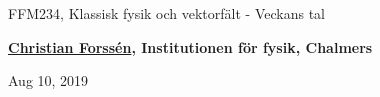 \documentclass[%
oneside,                 %
final,                   %
10pt]{article}
\begin{document}

\newcommand{\exercisesection}[1]{\subsection*{#1}}







\thispagestyle{empty}

\begin{center}
{\LARGE\bf
\begin{spacing}{1.25}
FFM234, Klassisk fysik och vektorfält - Veckans tal
\end{spacing}
}
\end{center}


\begin{center}
{\bf \href{{http://fy.chalmers.se/subatom/nt/}}{Christian Forssén}, Institutionen för fysik, Chalmers${}^{}$} \\ [0mm]
\end{center}

\begin{center}
\end{center}
    

\begin{center}
Aug 10, 2019
\end{center}

\vspace{1cm}
\end{document}
